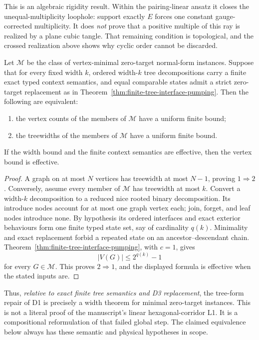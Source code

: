 This is an algebraic rigidity result.  Within the pairing-linear ansatz it
closes the unequal-multiplicity loophole: support exactly \(E\) forces one
constant gauge-corrected multiplicity.  It does \emph{not} prove that a
positive multiple of this ray is realized by a plane cubic tangle.  That
remaining condition is topological, and the crossed realization above shows
why cyclic order cannot be discarded.

\begin{theorem}
\label{thm:exact-width-criterion}
\Sprose
Let \(\mathcal M\) be the class of vertex-minimal zero-target normal-form
instances.  Suppose that for every fixed width \(k\), ordered width-\(k\)
tree decompositions carry a finite exact typed context semantics, and equal
comparable states admit a strict zero-target replacement as in
Theorem~\ref{thm:finite-tree-interface-pumping}.  Then the following are
equivalent:
\begin{enumerate}
\item the vertex counts of the members of \(\mathcal M\) have a uniform
finite bound;
\item the treewidths of the members of \(\mathcal M\) have a uniform finite
bound.
\end{enumerate}
If the width bound and the finite context semantics are effective, then the
vertex bound is effective.
\end{theorem}

\begin{proof}
A graph on at most \(N\) vertices has treewidth at most \(N-1\), proving
\(1\Rightarrow2\).  Conversely, assume every member of \(\mathcal M\) has
treewidth at most \(k\).  Convert a width-\(k\) decomposition to a reduced
nice rooted binary decomposition.  Its introduce nodes account for at most
one graph vertex each; join, forget, and leaf nodes introduce none.  By
hypothesis its ordered interfaces and exact exterior behaviours form one
finite typed state set, say of cardinality \(q(k)\).  Minimality and exact
replacement forbid a repeated state on an ancestor--descendant chain.
Theorem~\ref{thm:finite-tree-interface-pumping}, with \(c=1\), gives
\[
                         |V(G)|\le 2^{q(k)}-1
\]
for every \(G\in\mathcal M\).  This proves \(2\Rightarrow1\), and the
displayed formula is effective when the stated inputs are.
\end{proof}

Thus, \emph{relative to exact finite tree semantics and D3 replacement}, the
tree-form repair of D1 is precisely a width theorem for minimal zero-target
instances.  This is not a literal proof of the manuscript's linear
hexagonal-corridor L1.  It is a compositional reformulation of that failed
global step.  The claimed equivalence below always has these semantic and
physical hypotheses in scope.

